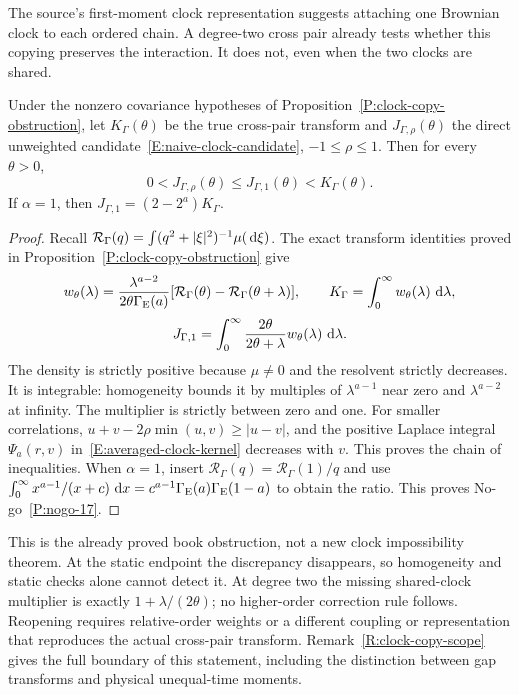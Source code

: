 The source's first-moment clock representation suggests attaching one
Brownian clock to each ordered chain. A degree-two cross pair already tests
whether this copying preserves the interaction. It does not, even when
the two clocks are shared.

\setcounter{nogo}{16}
\begin{nogo}
  \label{P:nogo-17}
  Under the nonzero covariance hypotheses of
  Proposition~\ref{P:clock-copy-obstruction}, let $K_\Gamma(\theta)$ be the
  true cross-pair transform and $J_{\Gamma,\rho}(\theta)$ the direct
  unweighted candidate~\eqref{E:naive-clock-candidate}, $-1\le\rho\le1$.
  Then for every $\theta>0$,
  \[
    0<J_{\Gamma,\rho}(\theta)\le J_{\Gamma,1}(\theta)<K_\Gamma(\theta).
  \]
  If $\alpha=1$, then $J_{\Gamma,1}=(2-2^a)K_\Gamma$.
\end{nogo}
\begin{proof}
  Recall $\mathcal R_\Gamma(q)=\int(q^2+|\xi|^2)^{-1}\mu(\,\mathrm{d}\xi)$.
  The exact transform identities proved in
  Proposition~\ref{P:clock-copy-obstruction} give
  \[
    w_\theta(\lambda)=
    \frac{\lambda^{a-2}}{2\theta\Gamma_{\mathrm E}(a)}
    [\mathcal R_\Gamma(\theta)-\mathcal R_\Gamma(\theta+\lambda)],
    \qquad
    K_\Gamma=\int_0^\infty w_\theta(\lambda)\,\,\mathrm{d}\lambda,
  \]
  \[
    J_{\Gamma,1}=\int_0^\infty
    \frac{2\theta}{2\theta+\lambda}w_\theta(\lambda)\,\,\mathrm{d}\lambda.
  \]
  The density is strictly positive because $\mu\ne0$ and the resolvent
  strictly decreases. It is integrable: homogeneity bounds it by multiples
  of $\lambda^{a-1}$ near zero and $\lambda^{a-2}$ at infinity.
  The multiplier is strictly between zero and one. For smaller correlations,
  $u+v-2\rho\min(u,v)\ge|u-v|$, and the positive Laplace integral
  $\Psi_a(r,v)$ in~\eqref{E:averaged-clock-kernel} decreases with $v$.
  This proves the chain of inequalities. When $\alpha=1$, insert
  $\mathcal R_\Gamma(q)=\mathcal R_\Gamma(1)/q$ and use
  $\int_0^\infty x^{a-1}/(x+c)\,\,\mathrm{d} x
  =c^{a-1}\Gamma_{\mathrm E}(a)\Gamma_{\mathrm E}(1-a)$ to obtain the ratio.
  This proves No-go~\ref{P:nogo-17}.
\end{proof}

This is the already proved book obstruction, not a new clock impossibility
theorem. At the static endpoint the discrepancy disappears, so homogeneity
and static checks alone cannot detect it. At degree two the missing
shared-clock multiplier is exactly $1+\lambda/(2\theta)$; no higher-order
correction rule follows. Reopening requires relative-order weights or a
different coupling or representation that reproduces the actual cross-pair
transform. Remark~\ref{R:clock-copy-scope} gives the full boundary of this
statement, including the distinction between gap transforms and physical
unequal-time moments.

